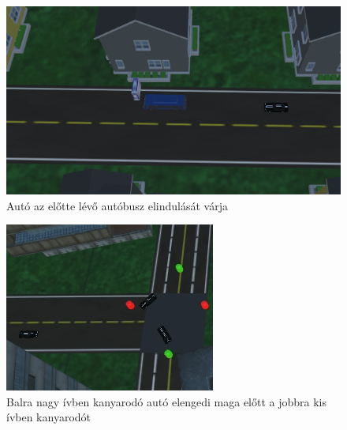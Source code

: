 \begin{figure}[H]
\includegraphics[width=\linewidth]{carwaiting.png}
\caption{Autó az előtte lévő autóbusz elindulását várja}
\label{fig:waiting}
\end{figure}
\begin{figure}[H]
\includegraphics[width=\linewidth]{rofway.png}
\caption{Balra nagy ívben kanyarodó autó elengedi maga előtt a jobbra kis ívben kanyarodót}
\label{fig:rightofway}
\end{figure}

